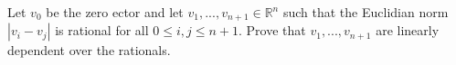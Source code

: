 Let $v_{0}$ be the zero ector and let $v_{1},...,v_{n+1}\in\mathbb{R}^{n}$ such that the Euclidian norm $|v_{i}-v_{j}|$ is rational for all $0\le i,j\le n+1$. Prove that $v_{1},...,v_{n+1}$ are linearly dependent over the rationals.